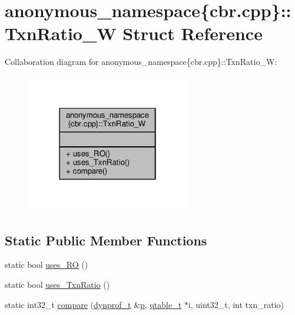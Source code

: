 \hypertarget{structanonymous__namespace_02cbr_8cpp_03_1_1TxnRatio__W}{\section{anonymous\-\_\-namespace\{cbr.\-cpp\}\-:\-:Txn\-Ratio\-\_\-\-W Struct Reference}
\label{structanonymous__namespace_02cbr_8cpp_03_1_1TxnRatio__W}
}


Collaboration diagram for anonymous\-\_\-namespace\{cbr.\-cpp\}\-:\-:Txn\-Ratio\-\_\-\-W\-:
\nopagebreak
\begin{figure}[H]
\begin{center}
\leavevmode
\includegraphics[width=202pt]{structanonymous__namespace_02cbr_8cpp_03_1_1TxnRatio__W__coll__graph}
\end{center}
\end{figure}
\subsection*{Static Public Member Functions}
\begin{DoxyCompactItemize}
\item 
static bool \hyperlink{structanonymous__namespace_02cbr_8cpp_03_1_1TxnRatio__W_a2fe14a6f0aac5c6805442c01c919e308}{uses\-\_\-\-R\-O} ()
\item 
static bool \hyperlink{structanonymous__namespace_02cbr_8cpp_03_1_1TxnRatio__W_aabe93bebe9c474fc8175309c27b66b8b}{uses\-\_\-\-Txn\-Ratio} ()
\item 
static int32\-\_\-t \hyperlink{structanonymous__namespace_02cbr_8cpp_03_1_1TxnRatio__W_a8b5056296015da558fc828cf905e124a}{compare} (\hyperlink{structstm_1_1dynprof__t}{dynprof\-\_\-t} \&\hyperlink{counted__ptr_8hpp_a5c9f59d7c24e3fd6ceae319a968fc3e0}{p}, \hyperlink{structstm_1_1qtable__t}{qtable\-\_\-t} $\ast$i, uint32\-\_\-t, int txn\-\_\-ratio)
\end{DoxyCompactItemize}


